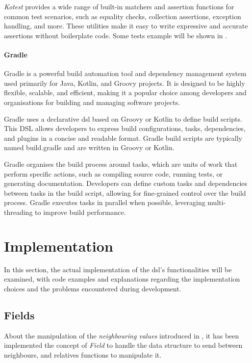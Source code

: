 \emph{Kotest} provides a wide range of built-in matchers and assertion functions for common test scenarios, such as equality
checks, collection assertions, exception handling, and more.
These utilities make it easy to write expressive and accurate assertions without boilerplate code.
Some tests example will be shown in .

\paragraph{Gradle}
Gradle is a powerful build automation tool and dependency management system used primarily for Java, Kotlin, and Groovy projects.
It is designed to be highly flexible, scalable, and efficient, making it a popular choice among developers and
organisations for building and managing software projects.

Gradle uses a declarative \ac{dsl} based on Groovy or Kotlin to define build scripts.
This DSL allows developers to express build configurations, tasks, dependencies, and plugins in a concise and readable format.
Gradle build scripts are typically named build.gradle and are written in Groovy or Kotlin.

Gradle organises the build process around tasks, which are units of work that perform specific actions, such as compiling
source code, running tests, or generating documentation.
Developers can define custom tasks and dependencies between tasks in the build script, allowing for fine-grained control over the build process.
Gradle executes tasks in parallel when possible, leveraging multi-threading to improve build performance.

\section{Implementation}
\label{sec:implementation}
In this section, the actual implementation of the \ac{dsl}'s functionalities will be examined, with code examples and explanations
regarding the implementation choices and the problems encountered during development.

\subsection{Fields}
\label{subsec:fields}
About the manipulation of the \emph{neighbouring values} introduced in , it has been implemented
the concept of \emph{Field} to handle the data structure to send between neighbours, and relatives functions to manipulate it.

